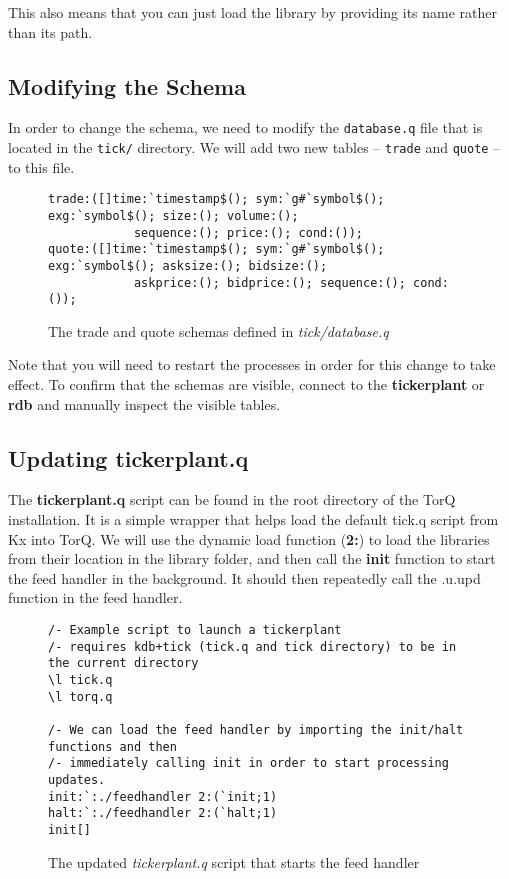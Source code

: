 This also means that you can just load the library by providing its name rather than its path.

\subsection{Modifying the Schema}

In order to change the schema, we need to modify the \verb|database.q| file that is located in the
\verb|tick/| directory. We will add two new tables -- \verb|trade| and \verb|quote| -- to this file.

\begin{figure}[h]
\begin{lstlisting}
trade:([]time:`timestamp$(); sym:`g#`symbol$(); exg:`symbol$(); size:(); volume:();
			sequence:(); price:(); cond:());
quote:([]time:`timestamp$(); sym:`g#`symbol$(); exg:`symbol$(); asksize:(); bidsize:();
			askprice:(); bidprice:(); sequence:(); cond:());
\end{lstlisting}
\caption{The trade and quote schemas defined in \textit{tick/database.q}}
\end{figure}

Note that you will need to restart the processes in order for this change to take effect. To confirm that the schemas are visible, connect to the \textbf{tickerplant} or \textbf{rdb} and manually inspect the visible tables.

\subsection{Updating tickerplant.q}

The \textbf{tickerplant.q} script can be found in the root directory of the TorQ installation. It is a simple wrapper that helps load the default tick.q script from Kx into TorQ. We will use the dynamic load function (\textbf{2:}) to load the libraries from their location in the library folder, and then call the \textbf{init}
function to start the feed handler in the background. It should then repeatedly call the .u.upd function in the
feed handler.

\begin{figure}[h]
\begin{lstlisting}
/- Example script to launch a tickerplant
/- requires kdb+tick (tick.q and tick directory) to be in the current directory
\l tick.q
\l torq.q

/- We can load the feed handler by importing the init/halt functions and then
/- immediately calling init in order to start processing updates.
init:`:./feedhandler 2:(`init;1)
halt:`:./feedhandler 2:(`halt;1)
init[]
\end{lstlisting}
\caption{The updated \textit{tickerplant.q} script that starts the feed handler}
\end{figure}

